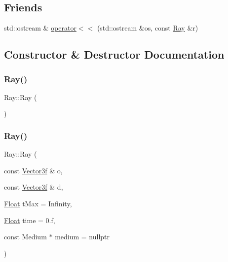 \subsection*{Friends}
\begin{DoxyCompactItemize}
\item 
std\+::ostream \& \mbox{\hyperlink{classRay_ab3d8282886cc0ee5f020164865c0ca50}{operator$<$$<$}} (std\+::ostream \&os, const \mbox{\hyperlink{classRay}{Ray}} \&r)
\end{DoxyCompactItemize}


\subsection{Constructor \& Destructor Documentation}
\mbox{\label{classRay_a2e3d2c29f2df4ab3da10da79d4acb852}} 
\subsubsection{\texorpdfstring{Ray()}{Ray()}\hspace{0.1cm}{\footnotesize\ttfamily [1/2]}}
{\footnotesize\ttfamily Ray\+::\+Ray (\begin{DoxyParamCaption}{ }\end{DoxyParamCaption})}

\mbox{\label{classRay_ad17d8a78f36c7d5c8613f8357ac7d78f}} 
\subsubsection{\texorpdfstring{Ray()}{Ray()}\hspace{0.1cm}{\footnotesize\ttfamily [2/2]}}
{\footnotesize\ttfamily Ray\+::\+Ray (\begin{DoxyParamCaption}\item[{const \mbox{\hyperlink{cyclop_8hpp_a5a0a2e85b081623ef3f7e7e8d43024f5}{Vector3f}} \&}]{o,  }\item[{const \mbox{\hyperlink{cyclop_8hpp_a5a0a2e85b081623ef3f7e7e8d43024f5}{Vector3f}} \&}]{d,  }\item[{\mbox{\hyperlink{cyclop_8hpp_a07afd7094cb489cbd514c76e6f55d34f}{Float}}}]{t\+Max = {\ttfamily Infinity},  }\item[{\mbox{\hyperlink{cyclop_8hpp_a07afd7094cb489cbd514c76e6f55d34f}{Float}}}]{time = {\ttfamily 0.f},  }\item[{const Medium $\ast$}]{medium = {\ttfamily nullptr} }\end{DoxyParamCaption})}



